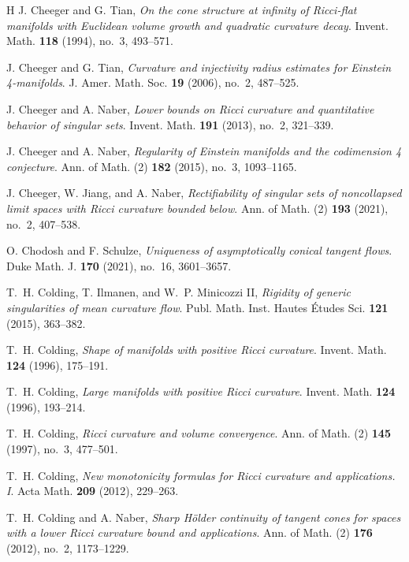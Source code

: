 \documentclass[11pt,reqno]{amsart}
\numberwithin{equation}{section}
\theoremstyle{definition}
\theoremstyle{remark}
\begin{document}
\begin{thebibliography}{H}
J. Cheeger and G. Tian,
\textit{On the cone structure at infinity of Ricci-flat manifolds with Euclidean volume growth and quadratic curvature decay}.
Invent. Math. \textbf{118} (1994), no.~3, 493--571.

J. Cheeger and G. Tian,
\textit{Curvature and injectivity radius estimates for Einstein 4-manifolds}.
J. Amer. Math. Soc. \textbf{19} (2006), no.~2, 487--525.

J. Cheeger and A. Naber,
\textit{Lower bounds on Ricci curvature and quantitative behavior of singular sets}.
Invent. Math. \textbf{191} (2013), no.~2, 321--339.

J. Cheeger and A. Naber,
\textit{Regularity of Einstein manifolds and the codimension 4 conjecture}.
Ann. of Math. (2) \textbf{182} (2015), no.~3, 1093--1165.

J. Cheeger, W. Jiang, and A. Naber,
{\textit{Rectifiability of singular sets of noncollapsed limit spaces with Ricci curvature bounded below}}.
Ann. of Math. (2) \textbf{193} (2021), no.~2, 407--538.

O. Chodosh and F. Schulze,
\textit{Uniqueness of asymptotically conical tangent flows}.
Duke Math. J. \textbf{170} (2021), no.~16, 3601--3657.

T.~H. Colding, T. Ilmanen, and W.~P. Minicozzi II,
\textit{Rigidity of generic singularities of mean curvature flow}.
Publ. Math. Inst. Hautes Études Sci. \textbf{121} (2015), 363--382.

T.~H. Colding,
\textit{Shape of manifolds with positive Ricci curvature}.
Invent. Math. \textbf{124} (1996), 175--191.

T.~H. Colding,
\textit{Large manifolds with positive Ricci curvature}.
Invent. Math. \textbf{124} (1996), 193--214.

T.~H. Colding,
\textit{Ricci curvature and volume convergence}.
Ann. of Math. (2) \textbf{145} (1997), no.~3, 477--501.

T.~H. Colding,
\textit{New monotonicity formulas for Ricci curvature and applications. I}.
Acta Math. \textbf{209} (2012), 229--263.

T.~H. Colding and A. Naber,
\textit{Sharp Hölder continuity of tangent cones for spaces with a lower Ricci curvature bound and applications}.
Ann. of Math. (2) \textbf{176} (2012), no.~2, 1173--1229.


\end{thebibliography}
\end{document}
